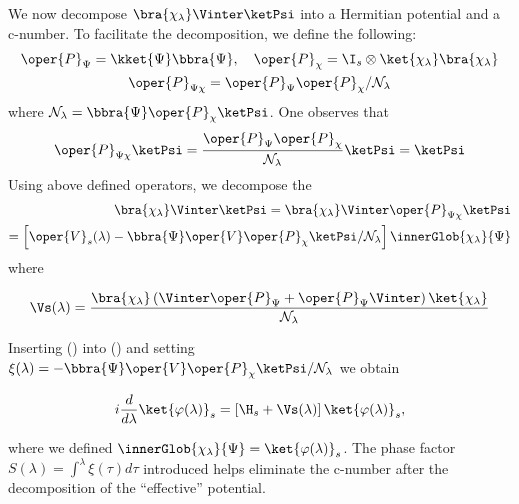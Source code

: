 We now decompose $\bra{\chi_\lambda}\Vinter\ketPsi$ into a Hermitian potential and a c-number. To facilitate the decomposition, we define the following:
 \begin{equation}
     \begin{gathered}
         \oper{P}_\Psi =\kket{\Psi} \bbra{\Psi}, \quad \oper{P}_\chi = \I_s \otimes \ket{\chi_\lambda}\bra{\chi_\lambda}\\
         \oper{P}_{\Psi \chi} = \oper{P}_\Psi\oper{P}_\chi /\mathcal{N}_\lambda
     \end{gathered}
 \end{equation}
where \(\mathcal{N}_\lambda = \bbra{\Psi}\oper{P}_\chi\ketPsi\). One observes that
\begin{equation}
\oper{P}_{\Psi \chi}\ketPsi = \frac{\oper{P}_\Psi\oper{P}_\chi}{\mathcal{N}_\lambda} \ketPsi
    = \ketPsi
\end{equation}
 Using above defined operators, we decompose the 
 \begin{equation}
 \label{eq:effective_Vs}
     \begin{aligned}
         \bra{\chi_\lambda}\Vinter\ketPsi = \bra{\chi_\lambda}\Vinter\oper{P}_{\Psi \chi}\ketPsi\\
         = \left[\oper{V}_s (\lambda)- \bbra{\Psi} \oper{V}\oper{P}_\chi \ketPsi/\mathcal{N}_\lambda \right] \innerGlob{\chi_\lambda}{\Psi}
     \end{aligned}
 \end{equation}
where 
\begin{mdframed}
    \begin{equation}
        \label{eq:chap3_effective_Vs}
        \Vs(\lambda) = \frac{\bra{\chi_\lambda} \left(\Vinter\oper{P}_{\Psi} + \oper{P}_{\Psi}\Vinter\right)\ket{\chi_\lambda}}{\mathcal{N}_\lambda}
    \end{equation}
\end{mdframed}

Inserting () into () and setting \(\xi(\lambda) = -\bbra{\Psi} \oper{V}\oper{P}_\chi \ketPsi/\mathcal{N}_\lambda\) we obtain
\begin{mdframed}
    \begin{equation}
        \label{eq:chap3_sebgem_TDSE}
         { i\dfrac{d}{d\lambda}\ket{\varphi(\lambda)}_s= \left[\H_s + \Vs (\lambda)\right]\ket{\varphi(\lambda)}_s},
        \end{equation}
\end{mdframed}
where we defined \(\innerGlob{\chi_\lambda}{\Psi} = \ket{\varphi(\lambda)}_s\).  The phase factor  \(S(\lambda) = \int^\lambda \xi(\tau)d\tau \) introduced helps eliminate the c-number after the decomposition of the ``effective'' potential. 


